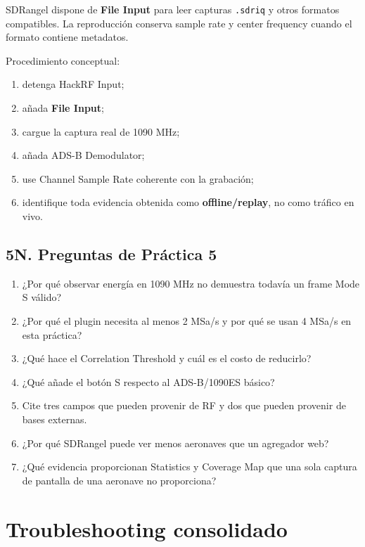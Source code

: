 SDRangel dispone de \textbf{File Input} para leer capturas \texttt{.sdriq} y otros formatos compatibles. La reproducción conserva sample rate y center frequency cuando el formato contiene metadatos.

Procedimiento conceptual:

\begin{enumerate}
    \item detenga HackRF Input;
    \item añada \textbf{File Input};
    \item cargue la captura real de 1090 MHz;
    \item añada ADS-B Demodulator;
    \item use Channel Sample Rate coherente con la grabación;
    \item identifique toda evidencia obtenida como \textbf{offline/replay}, no como tráfico en vivo.
\end{enumerate}

\subsection{5N. Preguntas de Práctica 5}

\begin{enumerate}
    \item ¿Por qué observar energía en 1090 MHz no demuestra todavía un frame Mode S válido?
    \item ¿Por qué el plugin necesita al menos 2 MSa/s y por qué se usan 4 MSa/s en esta práctica?
    \item ¿Qué hace el Correlation Threshold y cuál es el costo de reducirlo?
    \item ¿Qué añade el botón S respecto al ADS-B/1090ES básico?
    \item Cite tres campos que pueden provenir de RF y dos que pueden provenir de bases externas.
    \item ¿Por qué SDRangel puede ver menos aeronaves que un agregador web?
    \item ¿Qué evidencia proporcionan Statistics y Coverage Map que una sola captura de pantalla de una aeronave no proporciona?
\end{enumerate}

\clearpage
\section{Troubleshooting consolidado}

